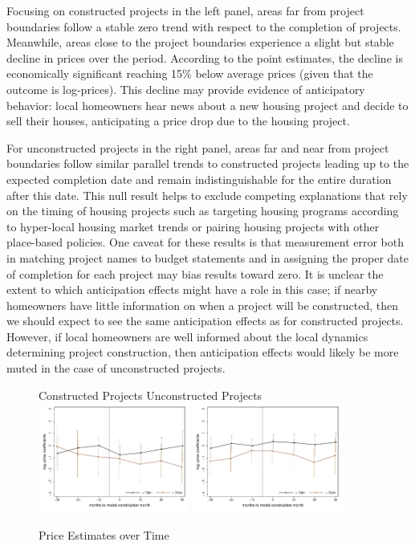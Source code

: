 \documentclass[12pt]{article}
\begin{document}
Focusing on constructed projects in the left panel, areas far from project boundaries follow a stable zero trend with respect to the completion of projects.  Meanwhile, areas close to the project boundaries experience a slight but stable decline in prices over the period.  According to the point estimates, the decline is economically significant reaching 15\% below average prices (given that the outcome is log-prices).  This decline may provide evidence of anticipatory behavior: local homeowners hear news about a new housing project and decide to sell their houses, anticipating a price drop due to the housing project.

For unconstructed projects in the right panel, areas far and near from project boundaries follow similar parallel trends to constructed projects leading up to the expected completion date and remain indistinguishable for the entire duration after this date.  This null result helps to exclude competing explanations that rely on the timing of housing projects such as targeting housing programs according to hyper-local housing market trends or pairing housing projects with other place-based policies.  One caveat for these results is that measurement error both in matching project names to budget statements and in assigning the proper date of completion for each project may bias results toward zero.  It is unclear the extent to which anticipation effects might have a role in this case; if nearby homeowners have little information on when a project will be constructed, then we should expect to see the same anticipation effects as for constructed projects.  However, if local homeowners are well informed about the local dynamics determining project construction, then anticipation effects would likely be more muted in the case of unconstructed projects.
\begin{figure}
\caption{Price Estimates over Time}\label{figure:timeplot}
\centering
Constructed Projects \hspace{3.6cm} Unconstructed Projects
\includegraphics[width=0.44\textwidth,trim={.77cm 0cm .21cm 0cm}]{figures/time_plot_rdp.pdf}
\includegraphics[width=0.44\textwidth,trim={.77cm 0cm .21cm 0cm},clip]{figures/time_plot_placebo.pdf}
\end{figure}
\end{document}
